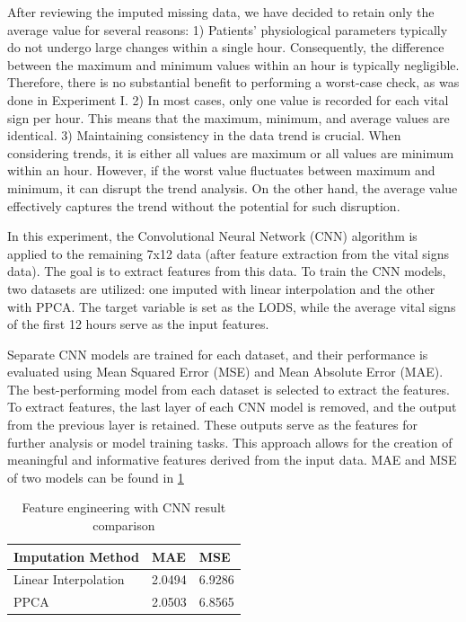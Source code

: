 \documentclass[12pt,a4paper,english
]{tunithesis}
\begin{document}
After reviewing the imputed missing data, we have decided to retain only the average value for several reasons: 1) Patients' physiological parameters typically do not undergo large changes within a single hour. Consequently, the difference between the maximum and minimum values within an hour is typically negligible. Therefore, there is no substantial benefit to performing a worst-case check, as was done in Experiment I. 2) In most cases, only one value is recorded for each vital sign per hour. This means that the maximum, minimum, and average values are identical. 3) Maintaining consistency in the data trend is crucial. When considering trends, it is either all values are maximum or all values are minimum within an hour. However, if the worst value fluctuates between maximum and minimum, it can disrupt the trend analysis. On the other hand, the average value effectively captures the trend without the potential for such disruption. 

In this experiment, the Convolutional Neural Network (CNN) algorithm is applied to the remaining 7x12 data (after feature extraction from the vital signs data). The goal is to extract features from this data. To train the CNN models, two datasets are utilized: one imputed with linear interpolation and the other with PPCA. The target variable is set as the LODS, while the average vital signs of the first 12 hours serve as the input features.

Separate CNN models are trained for each dataset, and their performance is evaluated using Mean Squared Error (MSE) and Mean Absolute Error (MAE). The best-performing model from each dataset is selected to extract the features. To extract features, the last layer of each CNN model is removed, and the output from the previous layer is retained. These outputs serve as the features for further analysis or model training tasks. This approach allows for the creation of meaningful and informative features derived from the input data. MAE and MSE of two models can be found in \ref{table:cnn_result_comparison}

\begin{table}[]
\centering
    \caption{Feature engineering with CNN result comparison}
    \label{table:cnn_result_comparison}
    \begin{tabular}{|l|l|l|}
        \hline
        \textbf{Imputation Method} & \textbf{MAE} & \textbf{MSE} \\ \hline
        Linear Interpolation & 2.0494 & 6.9286 \\ \hline
        PPCA & 2.0503 & 6.8565 \\ \hline
    \end{tabular}
\end{table}
\end{document}
